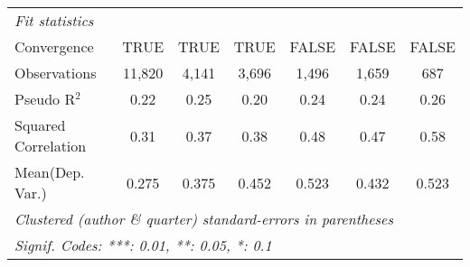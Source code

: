 \begin{tabular}{lcccccc}
   \midrule
   \emph{Fit statistics}\\
   Convergence                                                &TRUE           & TRUE    & TRUE         & FALSE         & FALSE          & FALSE\\  
   Observations                                               & 11,820        & 4,141   & 3,696        & 1,496         & 1,659          & 687\\  
   Pseudo R$^2$                                               & 0.22          & 0.25    & 0.20         & 0.24          & 0.24           & 0.26\\  
   Squared Correlation                                        & 0.31          & 0.37    & 0.38         & 0.48          & 0.47           & 0.58\\  
Mean(Dep. Var.) & 0.275 & 0.375 & 0.452 & 0.523 & 0.432 & 0.523 \\
   \midrule \midrule
   \multicolumn{7}{l}{\emph{Clustered (author \& quarter) standard-errors in parentheses}}\\
   \multicolumn{7}{l}{\emph{Signif. Codes: ***: 0.01, **: 0.05, *: 0.1}}\\
\end{tabular}
\par\endgroup
